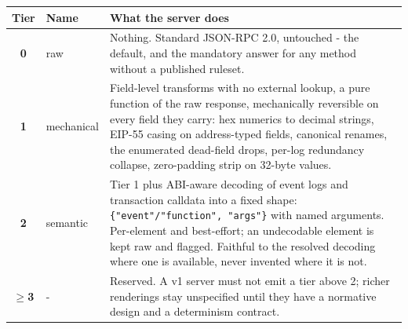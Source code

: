\documentclass[11pt]{article}
\newcommand{\code}[1]{\texttt{#1}}
\begin{document}
\begin{table}[h]
\centering\small
\renewcommand{\arraystretch}{1.2}
\begin{tabularx}{\textwidth}{@{}c l >{\raggedright\arraybackslash}X@{}}
\toprule
\textbf{Tier} & \textbf{Name} & \textbf{What the server does}\\
\midrule
\textbf{0} & raw & Nothing. Standard JSON-RPC 2.0, untouched - the default, and the mandatory answer for any method without a published ruleset.\\
\addlinespace
\textbf{1} & mechanical & Field-level transforms with no external lookup, a pure function of the raw response, mechanically reversible on every field they carry: hex numerics to decimal strings, EIP-55 casing on address-typed fields, canonical renames, the enumerated dead-field drops, per-log redundancy collapse, zero-padding strip on 32-byte values.\\
\addlinespace
\textbf{2} & semantic & Tier 1 plus ABI-aware decoding of event logs and transaction calldata into a fixed shape: \code{\{"event"/"function", "args"\}} with named arguments. Per-element and best-effort; an undecodable element is kept raw and flagged. Faithful to the resolved decoding where one is available, never invented where it is not.\\
\addlinespace
$\geq$\textbf{3} & - & Reserved. A v1 server must not emit a tier above 2; richer renderings stay unspecified until they have a normative design and a determinism contract.\\
\bottomrule
\end{tabularx}
\end{table}
\end{document}
